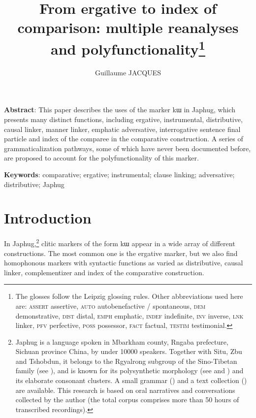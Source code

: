 \documentclass[oldfontcommands,oneside,a4paper,11pt]{article}
\newcommand{\ipa}[1]{{\phon #1}} %
\begin{document}
 

\title{From ergative to index of comparison: multiple reanalyses and polyfunctionality\footnote{The glosses follow the Leipzig glossing rules. Other abbreviations used here are:   \textsc{assert} assertive, \textsc{auto} autobenefactive / spontaneous,  \textsc{dem} demonstrative, \textsc{dist} distal, \textsc{emph} emphatic, \textsc{indef} indefinite, \textsc{inv} inverse,  \textsc{lnk} linker, \textsc{pfv} perfective, \textsc{poss} possessor, \textsc{fact} factual,  \textsc{testim} testimonial.} }

\author{Guillaume JACQUES}
\maketitle
   \sloppy
\textbf{Abstract}: This paper describes the uses of the marker  \ipa{kɯ} in Japhug, which presents many distinct functions, including ergative, instrumental, distributive, causal linker, manner linker, emphatic adversative, interrogative sentence final particle and index of the comparee in the comparative construction. A series of grammaticalization pathways, some of which have never been documented before, are proposed to account for the polyfunctionality of this marker.

\textbf{Keywords}: comparative; ergative; instrumental; clause linking; adversative; distributive; Japhug
 
 \section{Introduction}
  
 
 
In Japhug,\footnote{Japhug is a language spoken in Mbarkham county, Rngaba prefecture, Sichuan province China, by under 10000 speakers. Together with Situ, Zbu and Tshobdun, it belongs to the Rgyalrong subgroup of the Sino-Tibetan family (see \citealt{jackson00sidaba}), and is known for its polysynthetic morphology (see \citealt{jacques13harmonization} and  \citealt{jacques14antipassive}) and its elaborate consonant clusters. A small grammar  (\citealt{jacques08zh}) and a text collection (\citealt{jacques10gesar}) are available.  This research is based on oral narratives and conversations collected by the author (the total corpus comprises more than 50 hours of transcribed recordings). } clitic markers of the form \ipa{kɯ} appear in a wide array of different constructions. The most common one is the ergative marker, but we also find homophonous markers with syntactic functions as varied as distributive, causal linker,  complementizer and  index of the comparative construction.
\end{document}
